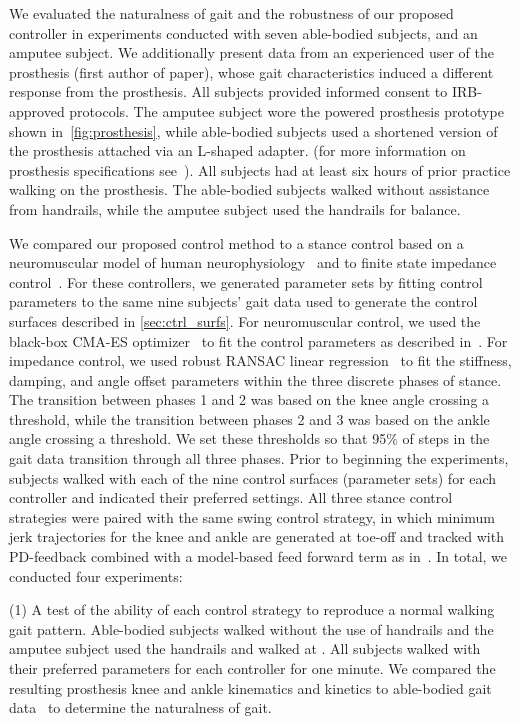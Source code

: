 We evaluated the naturalness of gait and the robustness of our proposed
controller in experiments conducted with seven able-bodied subjects, and an
amputee subject. We additionally present data from an experienced user of the
prosthesis (first author of paper), whose gait characteristics induced a
different response from the prosthesis. All subjects provided informed consent
to IRB-approved protocols.  The amputee subject wore the powered prosthesis
prototype shown in~\cref{fig:prosthesis}, while able-bodied subjects used a
shortened version of the prosthesis attached via an L-shaped adapter. (for more
information on prosthesis specifications see~\citep{thatte2018method}). All
subjects had at least six hours of prior practice walking on the prosthesis. The
able-bodied subjects walked without assistance from handrails, while the amputee
subject used the handrails for balance.

We compared our proposed control method to a stance control based on a
neuromuscular model of human neurophysiology~\citep{thatte2018method} and to
finite state impedance control~\citep{lawson2014robotic}. For these controllers,
we generated parameter sets by fitting control parameters to the same nine
subjects' gait data used to generate the control surfaces described in
\cref{sec:ctrl_surfs}. For neuromuscular control, we used the black-box CMA-ES
optimizer~\citep{hansen2006cma} to fit the control parameters as described
in~\citep{thatte2018method}. For impedance control, we used robust RANSAC linear
regression~\citep{fischler1981random} to fit the stiffness, damping, and angle
offset parameters within the three discrete phases of stance. The transition
between phases 1 and 2 was based on the knee angle crossing a threshold, while
the transition between phases 2 and 3 was based on the ankle angle crossing a
threshold. We set these thresholds so that 95\% of steps in the gait data
transition through all three phases. Prior to beginning the experiments,
subjects walked with each of the nine control surfaces (parameter sets) for each
controller and indicated their preferred settings. All three stance control
strategies were paired with the same swing control strategy, in which minimum
jerk trajectories for the knee and ankle are generated at toe-off and tracked
with PD-feedback combined with a model-based feed forward term as
in~\citep{lenzi2014speed}. In total, we conducted four experiments: 

(1) A test of the ability of each control strategy to reproduce a normal walking
gait pattern.  Able-bodied subjects walked without the use of handrails
 and the amputee subject used the handrails and walked at
.  All subjects walked with their preferred parameters for
each controller for one minute. We compared the resulting prosthesis knee and
ankle kinematics and kinetics to able-bodied gait data~\citep{bovi2011multiple}
to determine the naturalness of gait.

